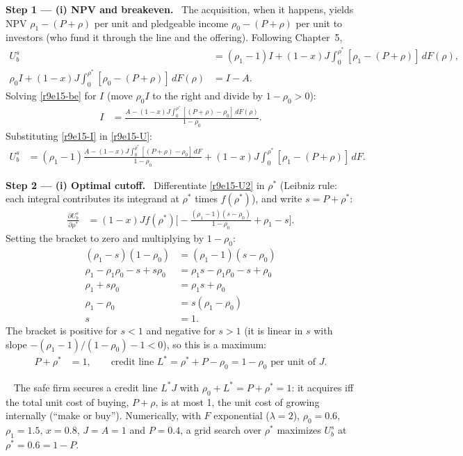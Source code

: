 \documentclass[11pt,a4paper]{article}
\newcommand{\step}[2]{\par\medskip\noindent\textbf{Step #1 --- #2.}~}
\newcommand{\answer}[1]{\par\smallskip\noindent\fbox{\textbf{Answer #1.}}~}
\begin{document}
\step{1}{(i) NPV and breakeven} The acquisition, when it happens, yields NPV $\rho_1-(P+\rho)$ per unit
and pledgeable income $\rho_0-(P+\rho)$ per unit to investors (who fund it through the line and the
offering). Following Chapter~5,
\begin{align}
  U_b^s &= (\rho_1-1)I+(1-x)J\int_0^{\rho^*}[\rho_1-(P+\rho)]\,dF(\rho), \label{r9e15-U}\\
  \rho_0I+(1-x)J\int_0^{\rho^*}[\rho_0-(P+\rho)]\,dF(\rho) &= I-A. \label{r9e15-be}
\end{align}
Solving \eqref{r9e15-be} for $I$ (move $\rho_0I$ to the right and divide by $1-\rho_0>0$):
\begin{align}
  I &= \frac{A-(1-x)J\int_0^{\rho^*}[(P+\rho)-\rho_0]\,dF(\rho)}{1-\rho_0}. \label{r9e15-I}
\end{align}
Substituting \eqref{r9e15-I} in \eqref{r9e15-U}:
\begin{align}
  U_b^s &= (\rho_1-1)\frac{A-(1-x)J\int_0^{\rho^*}[(P+\rho)-\rho_0]\,dF}{1-\rho_0}+(1-x)J\int_0^{\rho^*}[\rho_1-(P+\rho)]\,dF. \label{r9e15-U2}
\end{align}

\step{2}{(i) Optimal cutoff} Differentiate \eqref{r9e15-U2} in $\rho^*$ (Leibniz rule: each integral contributes
its integrand at $\rho^*$ times $f(\rho^*)$), and write $s=P+\rho^*$:
\begin{align}
  \frac{\partial U_b^s}{\partial\rho^*} &= (1-x)Jf(\rho^*)\Big[-\frac{(\rho_1-1)(s-\rho_0)}{1-\rho_0}+\rho_1-s\Big]. \nonumber
\end{align}
Setting the bracket to zero and multiplying by $1-\rho_0$:
\begin{align}
  (\rho_1-s)(1-\rho_0) &= (\rho_1-1)(s-\rho_0) \nonumber\\
  \rho_1-\rho_1\rho_0-s+s\rho_0 &= \rho_1s-\rho_1\rho_0-s+\rho_0 \nonumber\\
  \rho_1+s\rho_0 &= \rho_1s+\rho_0 \nonumber\\
  \rho_1-\rho_0 &= s(\rho_1-\rho_0) \nonumber\\
  s &= 1. \nonumber
\end{align}
The bracket is positive for $s<1$ and negative for $s>1$ (it is linear in $s$ with slope
$-(\rho_1-1)/(1-\rho_0)-1<0$), so this is a maximum:
\begin{align}
  P+\rho^* &= 1, \qquad\text{credit line } L^*=\rho^*+P-\rho_0=1-\rho_0 \text{ per unit of } J. \label{r9e15-cut}
\end{align}
\answer{(i)} The safe firm secures a credit line $L^*J$ with $\rho_0+L^*=P+\rho^*=1$: it acquires iff the
total unit cost of buying, $P+\rho$, is at most 1, the unit cost of growing internally (``make or buy'').
Numerically, with $F$ exponential ($\lambda=2$), $\rho_0=0.6$, $\rho_1=1.5$, $x=0.8$, $J=A=1$ and $P=0.4$, a grid
search over $\rho^*$ maximizes $U_b^s$ at $\rho^*=0.6=1-P$.
\end{document}
